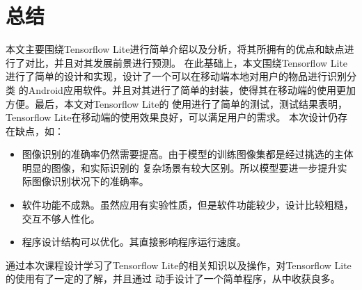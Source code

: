 \section{总结}
本文主要围绕Tensorflow Lite进行简单介绍以及分析，将其所拥有的优点和缺点进行了对比，并且对其发展前景进行预测。
在此基础上，本文围绕Tensorflow Lite进行了简单的设计和实现，设计了一个可以在移动端本地对用户的物品进行识别分类
的Android应用软件。并且对其进行了简单的封装，使得其在移动端的使用更加方便。最后，本文对Tensorflow Lite的
使用进行了简单的测试，测试结果表明，Tensorflow Lite在移动端的使用效果良好，可以满足用户的需求。
\newpage
本次设计仍存在缺点，如：
\begin{itemize}
    \item 图像识别的准确率仍然需要提高。由于模型的训练图像集都是经过挑选的主体明显的图像，和实际识别的
    复杂场景有较大区别。所以模型要进一步提升实际图像识别状况下的准确率。
    \item 软件功能不成熟。虽然应用有实验性质，但是软件功能较少，设计比较粗糙，交互不够人性化。
    \item 程序设计结构可以优化。其直接影响程序运行速度。
\end{itemize}

通过本次课程设计学习了Tensorflow Lite的相关知识以及操作，对Tensorflow Lite的使用有了一定的了解，并且通过
动手设计了一个简单程序，从中收获良多。